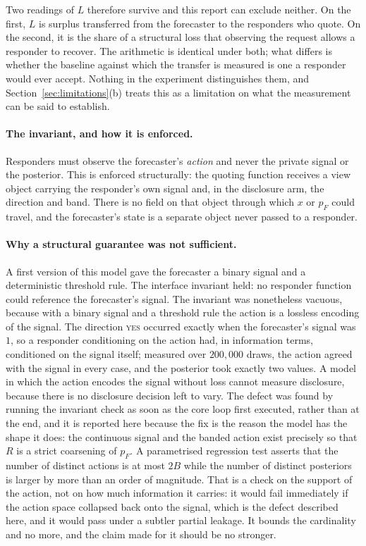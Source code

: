 Two readings of $L$ therefore survive and this report can exclude neither. On the first, $L$
is surplus transferred from the forecaster to the responders who quote. On the second, it is
the share of a structural loss that observing the request allows a responder to recover.
The arithmetic is identical under both; what differs is whether the baseline against which
the transfer is measured is one a responder would ever accept. Nothing in the experiment
distinguishes them, and Section~\ref{sec:limitations}(b) treats this as a limitation on what
the measurement can be said to establish.

\paragraph{The invariant, and how it is enforced.} Responders must observe the forecaster's
\emph{action} and never the private signal or the posterior. This is enforced structurally:
the quoting function receives a view object carrying the responder's own signal and, in the
disclosure arm, the direction and band. There is no field on that object through which $x$
or $p_F$ could travel, and the forecaster's state is a separate object never passed to a
responder.

\paragraph{Why a structural guarantee was not sufficient.} A first version of this model gave
the forecaster a binary signal and a deterministic threshold rule. The interface invariant
held: no responder function could reference the forecaster's signal. The invariant was
nonetheless vacuous, because with a binary signal and a threshold rule the action is a
lossless encoding of the signal. The direction \textsc{yes} occurred exactly when the
forecaster's signal was $1$, so a responder conditioning on the action had, in information
terms, conditioned on the signal itself; measured over $200{,}000$ draws, the action agreed
with the signal in every case, and the posterior took exactly two values. A model in which
the action encodes the signal without loss cannot measure disclosure, because there is no
disclosure decision left to vary. The defect was found by running the invariant check as
soon as the core loop first executed, rather than at the end, and it is reported here
because the fix is the reason the model has the shape it does: the continuous signal and the
banded action exist precisely so that $R$ is a strict coarsening of $p_F$. A parametrised
regression test asserts that the number of distinct actions is at most $2B$ while the number
of distinct posteriors is larger by more than an order of magnitude. That is a check on the
support of the action, not on how much information it carries: it would fail immediately if
the action space collapsed back onto the signal, which is the defect described here, and it
would pass under a subtler partial leakage. It bounds the cardinality and no more, and the
claim made for it should be no stronger.

